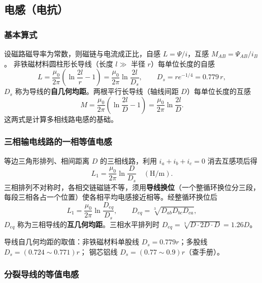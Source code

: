 \subsection{电感（电抗）}

\subsubsection{基本算式}

设磁路磁导率为常数，则磁链与电流成正比，自感 $L=\varPsi/i$，互感 $M_{AB}=\varPsi_{AB}/i_B$。
非铁磁材料圆柱形长导线（长度 $l\gg$ 半径 $r$）每单位长度的自感
\begin{equation}
  L=\frac{\mu_0}{2\pi}\left(\ln\frac{2l}{r}-1\right)=\frac{\mu_0}{2\pi}\ln\frac{2l}{D_s},
  \qquad D_s=re^{-1/4}=0.779\,r ,
\end{equation}
$D_s$ 称为导线的\textbf{自几何均距}。两根平行长导线（轴线间距 $D$）每单位长度的互感
\begin{equation}
  M=\frac{\mu_0}{2\pi}\left(\ln\frac{2l}{D}-1\right)=\frac{\mu_0}{2\pi}\ln\frac{2l}{D}.
\end{equation}
这两式是计算多相线路电感的基础。

\subsubsection{三相输电线路的一相等值电感}

等边三角形排列、相间距离 $D$ 的三相线路，利用 $i_a+i_b+i_c=0$ 消去互感项后得
\begin{equation}
  L_1=\frac{\mu_0}{2\pi}\ln\frac{D}{D_s}\quad(\text{H/m}).
\end{equation}
三相排列不对称时，各相交链磁链不等，须用\textbf{导线换位}（一个整循环换位分三段，
每段三相各占一个位置）使各相平均电感接近相等。经整循环换位后
\begin{equation}
  L_1=\frac{\mu_0}{2\pi}\ln\frac{D_{eq}}{D_s},
  \qquad D_{eq}=\sqrt[3]{D_{ab}D_{bc}D_{ca}},
\end{equation}
$D_{eq}$ 称为三相导线的\textbf{互几何均距}。三相水平排列时 $D_{eq}=\sqrt[3]{D\cdot 2D\cdot D}=1.26D$。

导线自几何均距的取值：非铁磁材料单股线 $D_s=0.779r$；多股线 $D_s=(0.724\sim0.771)r$；
钢芯铝线 $D_s=(0.77\sim0.9)r$（查手册）。

\subsubsection{分裂导线的等值电感}

